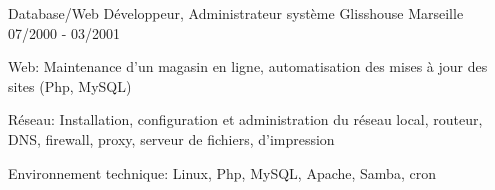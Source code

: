 \begin{cventries}
  \cventry
    {Database/Web Développeur, Administrateur système}
    {Glisshouse}
    {Marseille}
    {07/2000 - 03/2001}
    {
      \begin{cvitems}
        \item {Web: Maintenance d'un magasin en ligne, automatisation des mises
            à jour des sites (Php, MySQL)}
        \item {Réseau: Installation, configuration et administration du réseau
            local, routeur, DNS, firewall, proxy, serveur de fichiers,
            d'impression}
        \item {Environnement technique: Linux, Php, MySQL, Apache, Samba, cron}
      \end{cvitems}
    }

\end{cventries}

